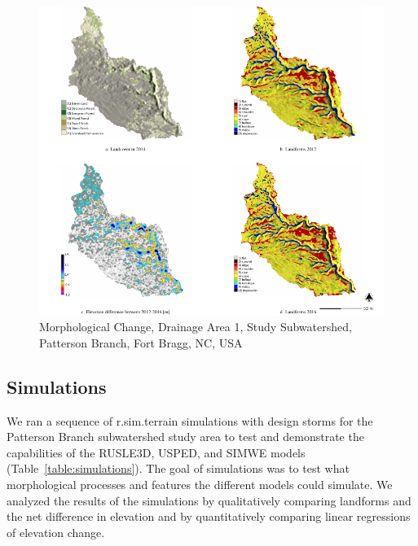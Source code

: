 \documentclass[gmd, manuscript]{copernicus}
\begin{document}
\begin{figure}
\center
\includegraphics[width=\textwidth,height=0.95\textheight,keepaspectratio]{figures/study_area.pdf}
\caption{Morphological Change, Drainage Area 1, Study Subwatershed, Patterson Branch, Fort Bragg, NC, USA}
\label{fig:study_area}
\end{figure}

\subsection{Simulations}
%
We ran a sequence of r.sim.terrain simulations 
with design storms
for the Patterson Branch subwatershed study area
to test and demonstrate the capabilities 
of the RUSLE3D, USPED, and SIMWE models
(Table~\ref{table:simulations}).
%
%
The goal of simulations was to test
what morphological processes and features 
the different models could simulate. 
%
We analyzed the results of the simulations 
by qualitatively comparing landforms 
and the net difference in elevation
and by quantitatively comparing 
linear regressions of elevation change.
\end{document}
